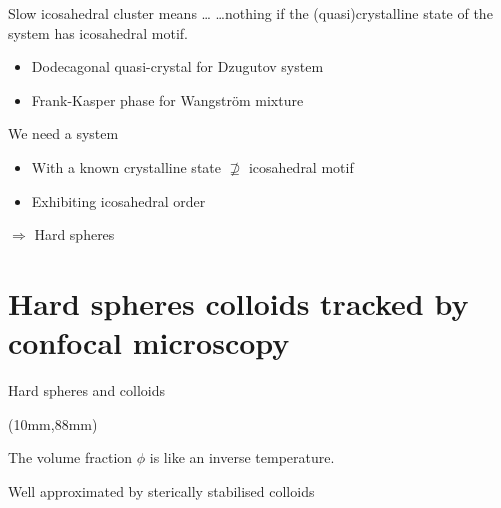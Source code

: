 \begin{frame}{Slow icosahedral cluster means \dots}
\dots \alert{nothing} if the (quasi)crystalline state of the system has icosahedral motif.
\begin{itemize}
	\item Dodecagonal quasi-crystal for Dzugutov system\\{\footnotesize\citet{Doye2003}}
	\item Frank-Kasper phase for Wangstr\"om mixture\\{\footnotesize\citet{Pedersen2010, Coslovich2011}}
\end{itemize}

\begin{block}{We need a system}
\begin{itemize}
	\item With a known crystalline state $\nsupseteq$ icosahedral motif
	\item Exhibiting icosahedral order
\end{itemize}
\centering$\Longrightarrow$ Hard spheres
\end{block}
\end{frame}

\section{Hard spheres colloids tracked by confocal microscopy}
\begin{frame}{Hard spheres and colloids}
	\begin{textblock*}{0.6\textwidth}(10mm,88mm)
		\simplephasediagram{}%
	\end{textblock*}
	The volume fraction $\phi$ is like an inverse temperature.
	\bigskip
	\def\svgwidth{\textwidth}
	
	\bigskip
	Well approximated by sterically stabilised colloids\\
	\begin{footnotesize}\citet{pusey1987ogt}\end{footnotesize}
\end{frame}

